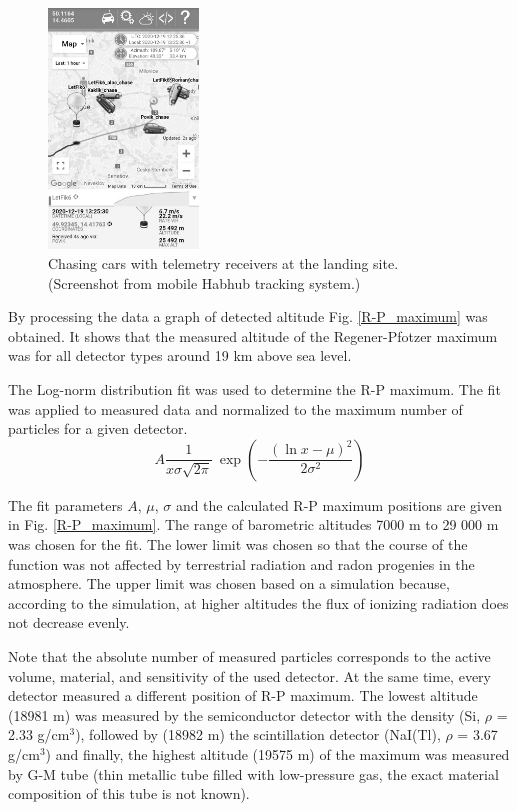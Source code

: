 \documentclass{Rpd}
\begin{document}
\begin{figure}%
	\centerline{\includegraphics[width=40mm]{img/FIK-6_rescue_team.png}}
	\caption{Chasing cars with telemetry receivers at the landing site. (Screenshot from mobile Habhub tracking system.) \label{FIK-6_rescue_team}}
\end{figure}

By processing the data a graph of detected altitude Fig. \ref{R-P_maximum} was obtained. It shows that the measured altitude of the Regener-Pfotzer maximum was for all detector types around 19 km above sea level.

The Log-norm distribution fit was used to determine the R-P maximum. The fit was applied to measured data and normalized to the maximum number of particles for a given detector.
\begin{equation}A \frac 1 {x\sigma\sqrt{2\pi}}\ \exp\left( - \frac{\left(\ln x-\mu\right)^2}{2\sigma^2}\right)\end{equation}

The fit parameters $A$, $\mu$, $\sigma$ and the calculated R-P maximum positions are given in Fig. \ref{R-P_maximum}. The range of barometric altitudes 7000 m to 29 000 m was chosen for the fit. The lower limit was chosen so that the course of the function was not affected by terrestrial radiation and radon progenies in the atmosphere. The upper limit was chosen based on a simulation because, according to the simulation, at higher altitudes the flux of ionizing radiation does not decrease evenly. 

Note that the absolute number of measured particles corresponds to the active volume, material, and sensitivity of the used detector. At the same time, every detector measured a different position of R-P maximum. The lowest altitude (18981 m) was measured by the semiconductor detector with the density (Si, $\rho$ = 2.33 g/cm$^3$), followed by (18982 m) the scintillation detector (NaI(Tl), $\rho$ = 3.67 g/cm$^3$) and finally, the highest altitude (19575 m) of the maximum was measured by G-M tube (thin metallic tube filled with low-pressure gas, the exact material composition of this tube is not known).
\end{document}

